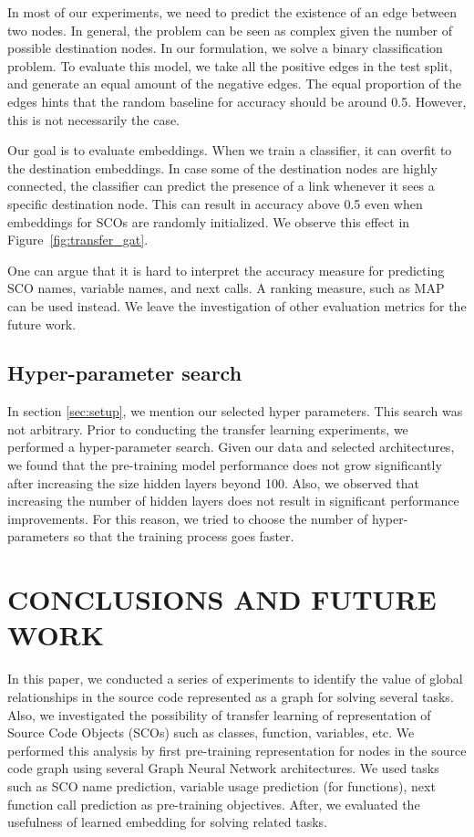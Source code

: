 \documentclass[a4paper,twoside]{article}
\begin{document}
In most of our experiments, we need to predict the existence of an edge between two nodes. In general, the problem can be seen as complex given the number of possible destination nodes. In our formulation, we solve a binary classification problem. To evaluate this model, we take all the positive edges in the test split, and generate an equal amount of the negative edges. The equal proportion of the edges hints that the random baseline for accuracy should be around 0.5. However, this is not necessarily the case. 

Our goal is to evaluate embeddings. When we train a classifier, it can overfit to the destination embeddings. In case some of the destination nodes are highly connected, the classifier can predict the presence of a link whenever it sees a specific destination node. This can result in accuracy above 0.5 even when embeddings for SCOs are randomly initialized. We observe this effect in Figure~\ref{fig:transfer_gat}. 

One can argue that it is hard to interpret the accuracy measure for predicting SCO names, variable names, and next calls. A ranking measure, such as MAP can be used instead. We leave the investigation of other evaluation metrics for the future work.

\subsection{Hyper-parameter search}

In section \ref{sec:setup}, we mention our selected hyper parameters. This search was not arbitrary. Prior to conducting the transfer learning experiments, we performed a hyper-parameter search. Given our data and selected architectures, we found that the pre-training model performance does not grow significantly after increasing the size hidden layers beyond 100. Also, we observed that increasing the number of hidden layers does not result in significant performance improvements. For this reason, we tried to choose the number of hyper-parameters so that the training process goes faster. 

\section{\uppercase{Conclusions and Future Work}}\label{sec:conclusion}

In this paper, we conducted a series of experiments to identify the value of global relationships in the source code represented as a graph for solving several tasks. Also, we investigated the possibility of transfer learning of representation of Source Code Objects (SCOs) such as classes, function, variables, etc. We performed this analysis by first pre-training representation for nodes in the source code graph using several Graph Neural Network architectures. We used tasks such as SCO name prediction, variable usage prediction (for functions), next function call prediction as pre-training objectives. After, we evaluated the usefulness of learned embedding for solving related tasks. 
\end{document}
